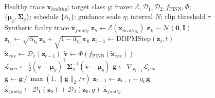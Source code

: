 \documentclass[conference]{IEEEtran}
\newcommand{\Enc}{\mathcal{E}}
\newcommand{\DecOne}{\mathcal{D}_1}
\newcommand{\DecTwo}{\mathcal{D}_2}
\newcommand{\PINN}{f_{\text{PINN}}}
\newcommand{\Feat}{\Phi}
\newcommand{\z}{\mathbf{z}}
\newcommand{\x}{\mathbf{x}}
\newcommand{\bv}{\mathbf{v}}          %
\newcommand{\g}{\mathbf{g}}
\newcommand{\muvec}{\boldsymbol{\mu}}
\newcommand{\Sigmamat}{\boldsymbol{\Sigma}}
\begin{document}
\begin{figure}[t]
\begin{algorithmic}[1]
\small
\REQUIRE Healthy trace $\x_{healthy}$; target class $y$;
         frozen $\Enc,\DecOne,\DecTwo,\PINN,\Feat$;
         $\{\muvec_y,\Sigmamat_y\}$; schedule $\{\bar\alpha_t\}$;
         guidance scale $\eta$; interval $N$; clip threshold $\tau$
\ENSURE  Synthetic faulty trace $\hat{\x}_{faulty}$
\STATE $\z_h \leftarrow \Enc(\x_{healthy})$
\STATE $\boldsymbol{\varepsilon}_0 \sim \mathcal{N}(\mathbf{0},\mathbf{I})$
\STATE $\z_{t_0} \leftarrow \sqrt{\bar\alpha_{t_0}}\,\z_h
       + \sqrt{1-\bar\alpha_{t_0}}\,\boldsymbol{\varepsilon}_0$
  \STATE $\z_{t-1} \leftarrow \mathrm{DDPMStep}(\z_t, t)$
    \STATE $\tilde{\x}_{env} \leftarrow \DecOne(\z_{t-1})$
    \STATE $\tilde{\bv}
           \leftarrow \Feat\!\left(\PINN(\tilde{\x}_{env})\right)$
    \STATE $\mathcal{L}_{pen} \leftarrow \tfrac{1}{2}
           (\tilde{\bv}-\muvec_y)^\top\Sigmamat_y^{-1}
           (\tilde{\bv}-\muvec_y)$
    \STATE $\g \leftarrow \nabla_{\z_{t-1}}\mathcal{L}_{pen}$
    \STATE $\g \leftarrow \g\,/\,\max(1,\|\g\|_2/\tau)$
           \hfill{}
    \STATE $\z_{t-1} \leftarrow \z_{t-1} - \eta_t\,\g$
  \ENDIF
\ENDFOR
\STATE $\hat{\x}_{faulty} \leftarrow
       \DecOne(\z_0) + \DecTwo(\z_0,y)$
\RETURN $\hat{\x}_{faulty}$
\end{algorithmic}
\label{alg:sdedit}
\end{figure}
\end{document}
